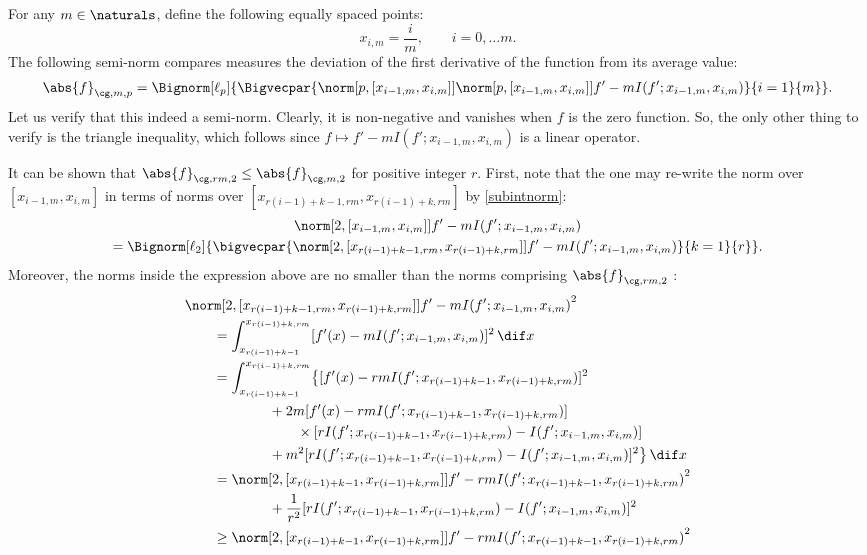 \documentclass[final]{elsarticle}
\newcommand{\Gnorm}[3]{\abs{#3}_{\cg,#2,#1}}
\theoremstyle{definition}
\theoremstyle{remark}
\begin{document}
For any $m \in \naturals$, define the following equally spaced points:
\[
x_{i,m}=\frac{i}{m}, \qquad i=0, \ldots m.
\]
The following semi-norm compares measures the deviation of the first derivative of the function from its average value:
\begin{equation} \label{Gnormdef}
\Gnorm{p}{m}{f}=\Bignorm[\ell_p]{\Bigvecpar{\norm[p,{[x_{i-1,m},x_{i,m}]}]{\norm[p,{[x_{i-1,m},x_{i,m}]}]{f' - m I(f';x_{i-1,m},x_{i,m})}}} {i=1}{m}}.
\end{equation}
Let us verify that this indeed a semi-norm.  Clearly, it is non-negative and vanishes when $f$ is the zero function.  So, the only other thing to verify is the triangle inequality, which follows since $f \mapsto f' - m I(f';x_{i-1,m},x_{i,m})$ is a linear operator.

It can be shown that $\Gnorm{2}{rm}{f} \le \Gnorm{2}{m}{f}$ for positive integer $r$.  First, note that the one may re-write the norm over $[x_{i-1,m},x_{i,m}]$ in terms of norms over $[x_{r(i-1)+k-1,rm},x_{r(i-1)+k,rm}]$ by \eqref{subintnorm}:
\begin{multline} \label{twonormsub}
\norm[2,{[x_{i-1,m},x_{i,m}]}]{f' - m I(f';x_{i-1,m},x_{i,m})} \\
= \Bignorm[\ell_2]{\bigvecpar{\norm[2,{[x_{r(i-1)+k-1,rm},x_{r(i-1)+k,rm}]}]{f' - m I(f';x_{i-1,m},x_{i,m})}}{k=1}{r}}.
\end{multline}
Moreover, the norms inside the expression above are no smaller than the norms comprising $\Gnorm{2}{rm}{f}$ :
\begin{align*}
\MoveEqLeft{\norm[2,{[x_{r(i-1)+k-1,rm},x_{r(i-1)+k,rm}]}]{f' - m I(f';x_{i-1,m},x_{i,m})}^2}\\
&=\int_{x_{r(i-1)+k-1}}^{x_{r(i-1)+k,rm}} [f'(x) - m I(f';x_{i-1,m},x_{i,m})]^2 \, \dif x \\
&=\int_{x_{r(i-1)+k-1}}^{x_{r(i-1)+k,rm}} \bigl\{ [f'(x) - rm I(f';x_{r(i-1)+k-1},x_{r(i-1)+k,rm})]^2  \\
& \qquad \qquad + 2m[f'(x) - rm I(f';x_{r(i-1)+k-1},x_{r(i-1)+k,rm})] \\
& \qquad \qquad \qquad \times [r I(f';x_{r(i-1)+k-1},x_{r(i-1)+k,rm})- I(f';x_{i-1,m},x_{i,m})]\\
&\qquad \qquad + m^2 [r I(f';x_{r(i-1)+k-1},x_{r(i-1)+k,rm})- I(f';x_{i-1,m},x_{i,m})]^2 \bigr\} \, \dif x \\
&=\norm[2,{[x_{r(i-1)+k-1},x_{r(i-1)+k,rm}]}]{f' - rm I(f';x_{r(i-1)+k-1},x_{r(i-1)+k,rm})}^2  \\
&\qquad \qquad + \frac{1}{r^2} [r I(f';x_{r(i-1)+k-1},x_{r(i-1)+k,rm})- I(f';x_{i-1,m},x_{i,m})]^2\\
& \ge \norm[2,{[x_{r(i-1)+k-1},x_{r(i-1)+k,rm}]}]{f' - rm I(f';x_{r(i-1)+k-1},x_{r(i-1)+k,rm})}^2 
\end{align*}
\end{document}
